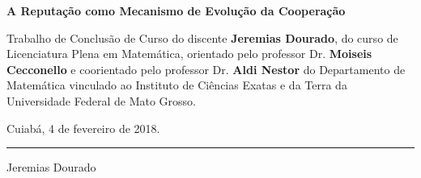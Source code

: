 %

\setcounter{page}{2}

\begin{center}
\textbf{\large A Reputação como Mecanismo de Evolução da Cooperação}
\end{center}


\vspace{9cm}

\begin{flushright}

\begin{minipage}{8cm}
Trabalho de Conclusão de Curso do discente \textbf{Jeremias Dourado}, do curso de Licenciatura Plena em Matemática, orientado pelo professor Dr. \textbf{Moiseis Cecconello} e coorientado pelo professor Dr. \textbf{Aldi Nestor} do Departamento de Matemática vinculado ao Instituto de Ciências Exatas e da Terra da Universidade Federal de Mato Grosso.

\vspace{0.5cm}

\begin{flushright}

Cuiabá, 4 de fevereiro de 2018.

\end{flushright}
\end{minipage}

\vspace{4cm}

\end{flushright}

\begin{center}

{\rule[0 ex]{8cm}{0.01cm}}

Jeremias Dourado

\end{center}

%
